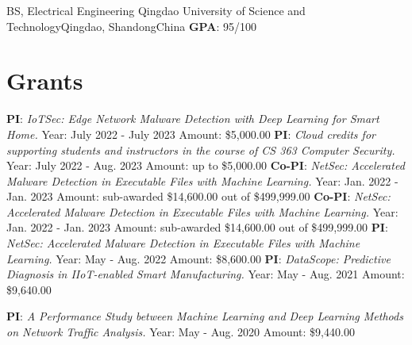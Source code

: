 \documentclass[11pt]{moderncv}
\begin{document}
        {BS, Electrical Engineering}
        {Qingdao University of Science and Technology}{Qingdao, Shandong}{China}
        {\textbf{GPA}: 95/100        
        }

\section{Grants}
%
{\textbf{PI}: \textit{IoTSec: Edge Network Malware Detection with Deep Learning for Smart Home.} \newline
	Year: July 2022 - July 2023 \newline
	Amount: \$5,000.00
}
%
{\textbf{PI}: \textit{Cloud credits for supporting students and instructors in the course of CS 363 Computer Security.} \newline
	Year: July 2022 - Aug. 2023 \newline
	Amount: up to \$5,000.00
}
%
{\textbf{Co-PI}: \textit{NetSec: Accelerated Malware Detection in Executable Files with Machine Learning.} \newline
	Year: Jan. 2022 - Jan. 2023 \newline
	Amount: sub-awarded \$14,600.00 out of \$499,999.00
}
%
{\textbf{Co-PI}: \textit{NetSec: Accelerated Malware Detection in Executable Files with Machine Learning.} \newline
Year: Jan. 2022 - Jan. 2023 \newline
Amount: sub-awarded \$14,600.00 out of \$499,999.00
}
%
{\textbf{PI}: \textit{NetSec: Accelerated Malware Detection in Executable Files with Machine Learning.} \newline
	Year: May - Aug. 2022 \newline
	Amount: \$8,600.00
}
%
{\textbf{PI}: \textit{DataScope: Predictive Diagnosis in IIoT-enabled Smart Manufacturing.} \newline
	Year: May - Aug. 2021 \newline
	Amount: \$9,640.00
}

%
{\textbf{PI}: \textit{A Performance Study between Machine Learning and Deep Learning Methods on	Network Traffic Analysis.} \newline
	Year: May - Aug. 2020 \newline
	Amount: \$9,440.00
}
\end{document}
